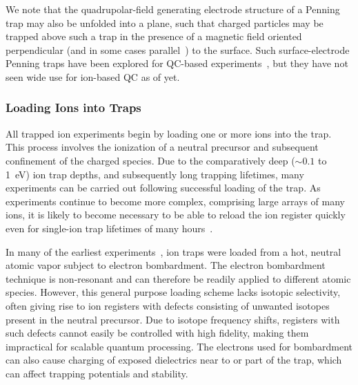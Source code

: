 \documentclass[%
reprint,
 amsmath,amssymb,
]{revtex4-1}
\begin{document}
We note that the quadrupolar-field generating electrode structure of a Penning trap may also be unfolded into a plane, such that charged particles may be trapped above such a trap in the presence of a magnetic field oriented perpendicular (and in some cases parallel~\cite{verdu_2011}) to the surface.  Such surface-electrode Penning traps have been explored for QC-based experiments~\cite{Stahl2005,planar_penning_designs_2010,PhysRevA.81.052335_2010}, but they have not seen wide use for ion-based QC as of yet.

\subsubsection{Loading Ions into Traps}
All trapped ion experiments begin by loading one or more ions into the trap. This process involves the ionization of a neutral precursor and subsequent confinement of the charged species. Due to the comparatively deep (${\sim}0.1$ to 1~eV) ion trap depths, and subsequently long trapping lifetimes, many experiments can be carried out following successful loading of the trap. As experiments continue to become more complex, comprising large arrays of many ions, it is likely to become necessary to be able to reload the ion register quickly even for single-ion trap lifetimes of many hours~\cite{BruzewiczArrayLoading2016}.

In many of the earliest experiments~\cite{NeuhauserTrappedIon1980,raizen1992ionic}, ion traps were loaded from a hot, neutral atomic vapor subject to electron bombardment. The electron bombardment technique is non-resonant and can therefore be readily applied to different atomic species. However, this general purpose loading scheme lacks isotopic selectivity, often giving rise to ion registers with defects consisting of unwanted isotopes present in the neutral precursor. Due to isotope frequency shifts, registers with such defects cannot easily be controlled with high fidelity, making them impractical for scalable quantum processing. The electrons used for bombardment can also cause charging of exposed dielectrics near to or part of the trap, which can affect trapping potentials and stability.
\end{document}
